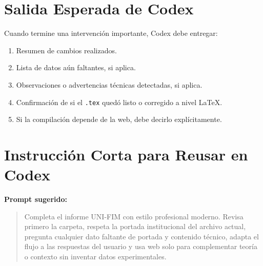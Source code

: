 \documentclass[12pt,a4paper]{article}
\begin{document}
\section{Salida Esperada de Codex}
Cuando termine una intervenci\'on importante, Codex debe entregar:
\begin{enumerate}
  \item Resumen de cambios realizados.
  \item Lista de datos a\'un faltantes, si aplica.
  \item Observaciones o advertencias t\'ecnicas detectadas, si aplica.
  \item Confirmaci\'on de si el \texttt{.tex} qued\'o listo o corregido a nivel LaTeX.
  \item Si la compilaci\'on depende de la web, debe decirlo expl\'icitamente.
\end{enumerate}

\section{Instrucci\'on Corta para Reusar en Codex}
\textbf{Prompt sugerido:}

\begin{quote}
Completa el informe UNI-FIM con estilo profesional moderno. Revisa primero la carpeta, respeta la portada institucional del archivo actual, pregunta cualquier dato faltante de portada y contenido t\'ecnico, adapta el flujo a las respuestas del usuario y usa web solo para complementar teor\'ia o contexto sin inventar datos experimentales.
\end{quote}
\end{document}
